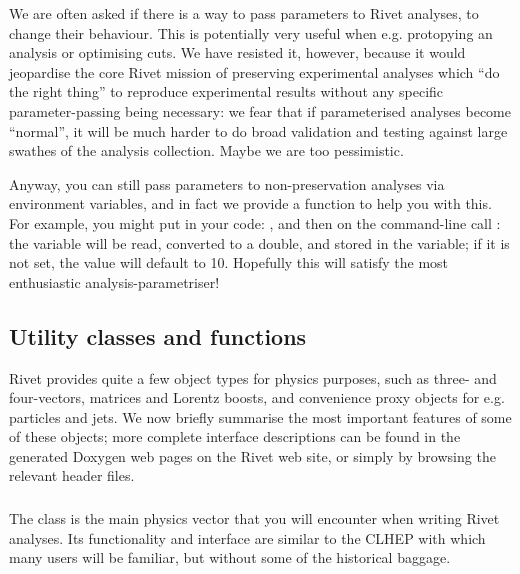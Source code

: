 
\begin{philosophy}
  We are often asked if there is a way to pass parameters to Rivet analyses, to
  change their behaviour. This is potentially very useful when e.g. protopying
  an analysis or optimising cuts. We have resisted it, however, because it would
  jeopardise the core Rivet mission of preserving experimental analyses which
  ``do the right thing'' to reproduce experimental results without any specific
  parameter-passing being necessary: we fear that if parameterised analyses
  become ``normal'', it will be much harder to do broad validation and testing
  against large swathes of the analysis collection. Maybe we are too pessimistic.

  Anyway, you can still pass parameters to non-preservation analyses via
  environment variables, and in fact we provide a  function to
  help you with this. For example, you might put in your code: , and then on the command-line call
  : the  variable will be read, converted
  to a double, and stored in the  variable; if it is not set, the value
  will default to 10. Hopefully this will satisfy the most enthusiastic
  analysis-parametriser!
\end{philosophy}


\subsection{Utility classes and functions}

Rivet provides quite a few object types for physics purposes, such as three- and
four-vectors, matrices and Lorentz boosts, and convenience proxy objects for
e.g. particles and jets. We now briefly summarise the most important features of
some of these objects; more complete interface descriptions can be found in the
generated Doxygen web pages on the Rivet web site, or simply by browsing the
relevant header files.

\subsubsection{}

The  class is the main physics vector that you will encounter
when writing Rivet analyses. Its functionality and interface are similar to the
CLHEP  with which many users will be familiar, but
without some of the historical baggage.

